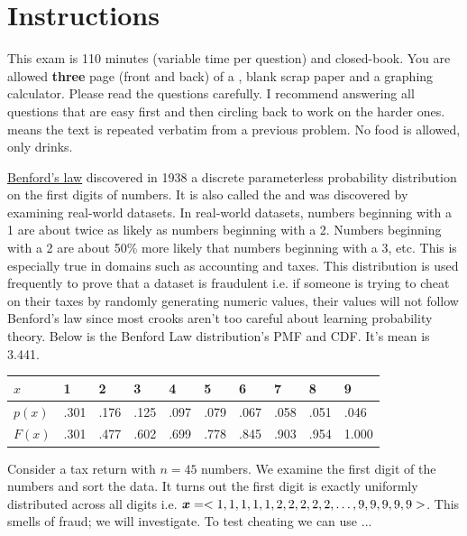 \documentclass[12pt,landscape]{article}
\begin{document}
\section*{Instructions}
This exam is 110 minutes (variable time per question) and closed-book. You are allowed \textbf{three} page (front and back) of a , blank scrap paper and a graphing calculator. Please read the questions carefully. I recommend answering all questions that are easy first and then circling back to work on the harder ones.  means the text is repeated verbatim from a previous problem. No food is allowed, only drinks. %

\pagebreak

\problem{} \href{https://en.wikipedia.org/wiki/Benford\%27s_law}{Benford's law} discovered in 1938 a discrete parameterless probability distribution on the first digits of numbers. It is also called the  and was discovered by examining real-world datasets. In real-world datasets, numbers beginning with a 1 are about twice as likely as numbers beginning with a 2. Numbers beginning with a 2 are about 50\% more likely that numbers beginning with a 3, etc. This is especially true in domains such as accounting and taxes. This distribution is used frequently to prove that a dataset is fraudulent i.e. if someone is trying to cheat on their taxes by randomly generating numeric values, their values will not follow Benford's law since most crooks aren't too careful about learning probability theory. Below is the Benford Law distribution's PMF and CDF. It's mean is 3.441.

\begin{table}[h]
\centering
\begin{tabular}{l|lllllllll}
$x$		&	1		& 	2		&	3		&	4		&	5		&	6		&	7		&		8	&	9 \\ \hline
$p(x)$	&	.301	&	.176	&	.125	&	.097	&	.079	&	.067	&	.058	& 		.051	&	.046 \\
$F(x)$  &   .301		&	.477	&	.602	&	.699	&	.778	&	.845	&	.903	& 		.954	&	1.000 \\
\end{tabular}
\end{table}
\FloatBarrier
\vspace{-0.2cm}
\noindent Consider a tax return with $n=45$ numbers. We examine the first digit of the numbers and sort the data. It turns out the first digit is exactly uniformly distributed across all digits i.e. $\boldsymbol{x} = <1,1,1,1,1,2,2,2,2,2, \ldots, 9,9,9,9,9>$.  This smells of fraud; we will investigate. To test cheating we can use ...
\end{document}
